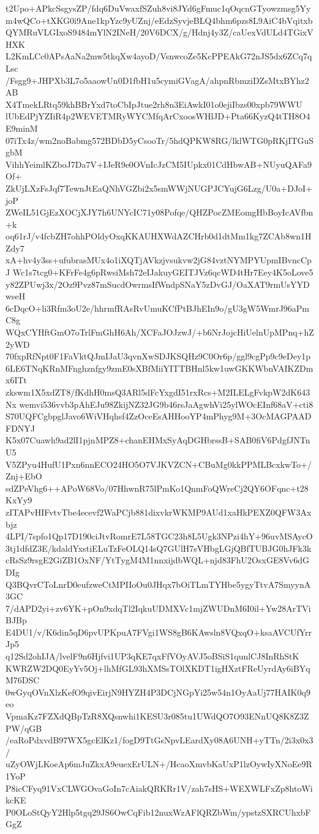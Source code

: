 t2Upo+APkcSsgysZP/fdq6DuVwaxfSZuh8vi8JYd6gFmuc1qOqcnGTyowzmsg5Yy
m4wQCo+tXKG0i9Ane1kpYzc9yUZnj/eEdzSyvjeBLQ4bhm6pzs8L9AiC4bVqitxb
QYMRuVLGIxoS9484mYlN2INeH/20V6DCX/g/Hdnj4y3Z/caUexVdULd4TGixVHXK
L2KmLCc0APsAaNa2mw5tkqXw4ayoD/VsnwcoZe5KcPPEAkG72nJS5dx6ZCq7qLsc
/Fsgg9+JHPXb3L7o5aaowUn0D1fbH1u5cymiGVagA/ahpnRbmziDZsMtxBYhz2AB
X4TmekLRtq59khBBrYxd7toCbIpJtue2rh8n3EiAwkI01o0ejiIbzs00xpb79WWU
lUbEdPjYZIiR4p2WEVETMRyWYCMfqArCxoosWHlJD+Pta66KyzQ4tTH8O4E9minM
07iTx4z/wm2noBabmg572BDbD5yCsooTr/5hdQPKW8RG/lklWTG0pRKjITGuSgbM
VihhYeimlKZboJ7Da7V+IJeR9e0OVnIcJzCM5IUpkx01CdHbwAB+NUyuQAFa9Of+
ZkUjLXzFsJqf7TewnJtEaQNhVGZbi2x5smWWjNUGPJCYujG6Lzg/U0a+DJoI+joP
ZWeIL51GjEzXOCjXJY7h6UNYcIC71y08Pofqe/QHZPocZMEomgHbBoyIcAVfbn+k
oq61rJ/v4fcbZH7ohhPOldyOxqKKAUHXWdAZCHrb0d1dtMm1kg7ZCAb8wn1HZdy7
xA+hv4y3ss+ufubrasMUx4o1iXQTjAVkzjvsukvw2jG84vztNYMPYUpmIBvncCpJ
Wc1s7tcg0+KFrFe4g6pRwsiMsh72eIJakuyGEITJVz6qcWD4tHr7Eey4K5oLove5
y82ZPUwj3x/2Oz9Pvz87mSucdOwrmsIfWndpSNaY5zDvGJ/OaXAT9rmUsYYDwseH
6cDqcO+li3Rfm3oU2e/hhrmfRAsRvUmuKCfPtBJhEIn9o/gU3gW5WmrJ96aPmC8g
WQxCYHftGmO7oTrlFmGhH6Ah/XCFaJOJzwJ/+b6NrJojcHiUelnUpMPnq+hZ2yWD
70fxpRfNpt0F1FaVktQJmIJaU3qvnXwSDJKSQHz9C0Or6p/ggl9cgPp9c9eDey1p
6LE6TNqKRnMFnghznfgy9zmE0sXBfMiiYITTBHnl5kw1uwGKKWbnVAIKZDmx6ITt
zkswm1X5xdZT8/fKdhH0msQ3ARl5dFcYxgdI51rxRcs+M2ILELgFvkpW2dK643Nx
wemvi536vvb3pAhEJu98ZkijNZ32JG9b46rsJaAgwhVi25ylWOcEInf68aV+cti8
S70UQFCgbpglJavo6WiVHqhsf4ZzOceEsAHHooYP4mPhyg9M+3OcMAGPAADFDNYJ
K5x07Cuawh9ad2lI1pjnMPZ8+chanEHMxSyAqDGHbrssB+SAB0fiV6PdgfJNTnU5
V5ZPyu4HufU1Pxn6nnECO24HO5O7VJKVZCN+CBuMg0kkPPMLBcxkwTo+/Znj+EbO
sdZPeVhg6++APoW68Vo/07HhwnR75lPmKo1QnmFoQWreCj2QY6OFqnc+t28KxYy9
zITAPvHIFvtvTbe4ecevf2WaPCjb881dixvkrWKMP9AUd1xaHkPEXZ0QFW3Axbjz
4LPI/7spfo1Qp17D190ciJtvRomrE7L58TGC23h8L5Ugk3NPzi4hY+96uvMSAycO
3tj1dfdZ3E/kdaldYxstiELuTzFeOLQ14sQ7GUlH7sVHbgLGjQBfTUBJG0hJFk3k
cRsSz9rsgE2GiZB1OxNF/YtTygM4M1nnxijdbWQL+njd83FhU2OsxGE8Vv6dGDIg
Q3BQvrCToLnrD0eufzweCtMPIIoOu0JHqx7bOiTLmTYHbe5ygyTtvA7SmyynA3GC
7/dAPD2yi+zv6YK+pOn9xdqTl2IqkuUDMXVc1mjZWUDnM6I0il+Yw28ArTViBJBp
E4DU1/v/K6din5qD6pvUPKpuA7FVgi1WS8gB6KAwsln8VQxqO+ksaAVCUfYrrJp5
q12Sd2ohIJA/lvelF9n6Hjfvi1UP3qKE7qxFfVOyAVJ5oBSiS1qunlCJ8InRhStK
KWRZW2DQ0EyYv5Oj+lhMfGL93hXMSsTOlXKDT1igHXztFReUyrdAy6iBYqM76DSC
0wGyqOVnXlzKefO9qivEirjN9HYZH4P3DCjNGpYi25w54n1OyAaUj77HAIK0q9eo
VpmaKz7FZXdQBpTzR8XQsnwhi1KESU3r085tu1UWdQO7O93ENnUQ8K8Z3ZPW/qGB
/eaRoPdxvdB97WX5gcElKz1/fogD9TtGsNpvLEardXy08A6UNH+yTTn/2i3x0x3/
uZyOWjLKoeAp6mJuZkxA9euexErULN+/HcaoXmvbKaUxP1lzOywIyXNoEe9R1YoP
P8icCFyq91VxCLWGOvaGoIn7cAiakQRKRr1V/zah7sHS+WEXWLFxZp8htoWikcKE
P0OLoStQyY2Hlp5tgq29JS6OwCqFib12nuxWzAFlQRZbWm/ypstzSXRCUhxbFGgZ
